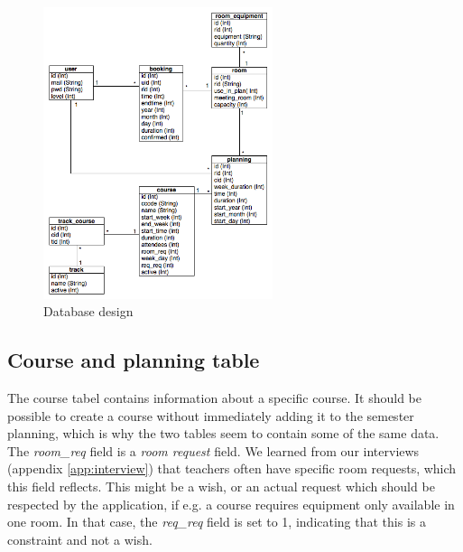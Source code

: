 \begin{figure}[htb]
\begin{center}
\leavevmode
\includegraphics[width=0.6\textwidth]{images/db-design.png}
\end{center}
\caption{Database design}
\label{fig:db_design}
\end{figure}

\subsection{Course and planning table}
\label{sub:course_planning_table}
The course tabel contains information about a specific course. It should be possible to create a course without immediately adding it to the semester planning, which is why the two tables seem to contain some of the same data. The \emph{room\_req} field is a \emph{room request} field. We learned from our interviews (appendix \ref{app:interview}) that teachers often have specific room requests, which this field reflects. This might be a wish, or an actual request which should be respected by the application, if e.g. a course requires equipment only available in one room. In that case, the \emph{req\_req} field is set to 1, indicating that this is a constraint and not a wish. 

